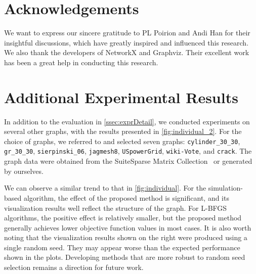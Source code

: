 \documentclass{jgaa-art}
\begin{document}

\section*{Acknowledgements}

We want to express our sincere gratitude to PL Poirion and Andi Han for their insightful discussions, which have greatly inspired and influenced this research.
We also thank the developers of NetworkX and Graphviz.
Their excellent work has been a great help in conducting this research.






\appendix

\section{Additional Experimental Results}
\label{app:large_graphs}


In addition to the evaluation in \cref{ssec:exprDetail}, we conducted experiments on several other graphs, with the results presented in \cref{fig:individual_2}.
For the choice of graphs, we referred to \citep{arleoDistributedMultilevelForceDirected2019,bartelExperimentalEvaluationMultilevel2011} and selected seven graphs: \texttt{cylinder\_30\_30}, \texttt{gr\_30\_30}, \texttt{sierpinski\_06}, \texttt{jagmesh8}, \texttt{USpowerGrid}, \texttt{wiki-Vote}, and \texttt{crack}.
The graph data were obtained from the SuiteSparse Matrix Collection~\citep{davisUniversityFloridaSparse2011} or generated by ourselves.



We can observe a similar trend to that in \cref{fig:individual}.
For the simulation-based algorithm, the effect of the proposed method is significant, and its visualization results well reflect the structure of the graph.
For L-BFGS algorithms, the positive effect is relatively smaller, but the proposed method generally achieves lower objective function values in most cases.
It is also worth noting that the visualization results shown on the right were produced using a single random seed.
They may appear worse than the expected performance shown in the plots.
Developing methods that are more robust to random seed selection remains a direction for future work.
\end{document}
